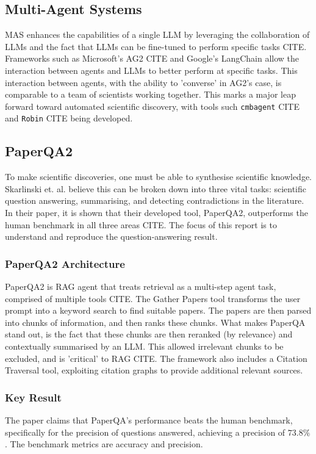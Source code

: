\subsection{Multi-Agent Systems}
MAS enhances the capabilities of a single LLM by leveraging the collaboration of LLMs and the fact that LLMs can be fine-tuned to perform specific tasks CITE. 
Frameworks such as Microsoft's AG2 CITE and Google's LangChain allow the interaction between agents and LLMs to better perform at specific tasks. 
This interaction between agents, with the ability to 'converse' in AG2's case, is comparable to a team of scientists working together. 
This marks a major leap forward toward automated scientific discovery, with tools such \texttt{cmbagent} CITE and \texttt{Robin} CITE being developed.\\

\subsection{PaperQA2}
To make scientific discoveries, one must be able to synthesise scientific knowledge.
Skarlinski et. al. believe this can be broken down into three vital tasks: scientific question answering, summarising, and detecting contradictions in the literature.
In their paper, it is shown that their developed tool, PaperQA2, outperforms the human benchmark in all three areas CITE. 
The focus of this report is to understand and reproduce the question-answering result. \\

\subsubsection{PaperQA2 Architecture}
PaperQA2 is RAG agent that treats retrieval as a multi-step agent task, comprised of multiple tools CITE. 
The Gather Papers tool transforms the user prompt into a keyword search to find suitable papers. 
The papers are then parsed into chunks of information, and then ranks these chunks. 
What makes PaperQA stand out, is the fact that these chunks are then reranked (by relevance) and contextually summarised by an LLM.
This allowed irrelevant chunks to be excluded, and is 'critical' to RAG CITE.
The framework also includes a Citation Traversal tool, exploiting citation graphs to provide additional relevant sources. \\

\subsubsection{Key Result}
The paper claims that PaperQA's performance beats the human benchmark, specifically for the precision of questions answered, achieving a precision of $73.8\%$. The benchmark metrics are accuracy and precision. \\

